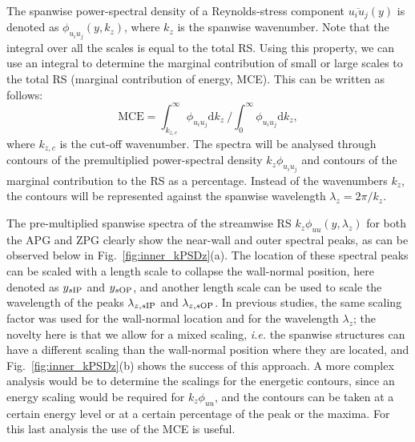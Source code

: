 

The spanwise power-spectral density of a Reynolds-stress component $\overline{u_iu_j}(y)$ is denoted as $\phi_{u_iu_j}(y,k_z)$, where $k_z$ is the spanwise wavenumber.
Note that the integral over all the scales is equal to the total RS. Using this property, we can use an integral to determine the marginal contribution of small or large scales to the total RS (marginal contribution of energy, MCE). This can be written as follows:
\begin{equation}
\mathrm{MCE} = \int_{k_{z,c}}^{\infty} \phi_{u_iu_j} \mathrm{d} k_z \ \bigg/ \int_{0}^{\infty} \phi_{u_iu_j} \mathrm{d} k_z,
\label{eq:cumsum}
\end{equation}
where $k_{z,c}$ is the cut-off wavenumber.
The spectra will be analysed through contours of the premultiplied power-spectral density $k_z\phi_{u_iu_j}$ and contours of the marginal contribution to the RS as a percentage. Instead of the wavenumbers $k_z$, the contours will be represented against the spanwise wavelength $\lambda_z=2\pi/k_z$.

The pre-multiplied spanwise spectra of the streamwise RS $k_z\phi_{uu}(y,\lambda_z)$ for both the APG and ZPG clearly show the near-wall and outer spectral peaks, as can be observed below in Fig.~\ref{fig:inner_kPSDz}(a). 
The location of these spectral peaks can be scaled with a length scale to collapse the wall-normal position, here denoted as $y_{s \rm IP}$ and $y_{s \rm OP}$, and another length scale can be used to scale the wavelength of the peaks $\lambda_{z,s \rm IP}$ and $\lambda_{z,s \rm OP}$.
In previous studies, the same scaling factor was used for the wall-normal location and for the wavelength $\lambda_z$; the novelty here is that we allow for a mixed scaling, {\it i.e.} the spanwise structures can have a different scaling than the wall-normal position where they are located, and Fig.~\ref{fig:inner_kPSDz}(b) shows the success of this approach.
A more complex analysis would be to determine the scalings for the energetic contours, since an energy scaling would be required for $k_z\phi_{uu}$, and the contours can be taken at a certain energy level or at a certain percentage of the peak or the maxima. For this last analysis the use of the MCE is useful. 

